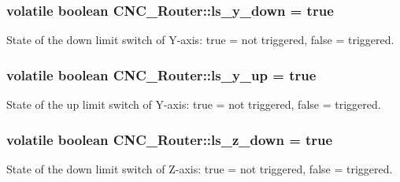 \hypertarget{class_c_n_c___router_a1932890e5458f9113355f1bdb854e1ce}{
\subsubsection[{ls\+\_\+y\+\_\+down}]{\setlength{\rightskip}{0pt plus 5cm}volatile boolean C\+N\+C\+\_\+\+Router\+::ls\+\_\+y\+\_\+down = true\hspace{0.3cm}{\ttfamily [static]}}}\label{class_c_n_c___router_a1932890e5458f9113355f1bdb854e1ce}


State of the down limit switch of Y-\/axis\+: true = not triggered, false = triggered. 

\hypertarget{class_c_n_c___router_a74a44cdb470bb6256551bffc3538b938}{
\subsubsection[{ls\+\_\+y\+\_\+up}]{\setlength{\rightskip}{0pt plus 5cm}volatile boolean C\+N\+C\+\_\+\+Router\+::ls\+\_\+y\+\_\+up = true\hspace{0.3cm}{\ttfamily [static]}}}\label{class_c_n_c___router_a74a44cdb470bb6256551bffc3538b938}


State of the up limit switch of Y-\/axis\+: true = not triggered, false = triggered. 

\hypertarget{class_c_n_c___router_a30b5c6e169b20b9d8b11be6d638b2958}{
\subsubsection[{ls\+\_\+z\+\_\+down}]{\setlength{\rightskip}{0pt plus 5cm}volatile boolean C\+N\+C\+\_\+\+Router\+::ls\+\_\+z\+\_\+down = true\hspace{0.3cm}{\ttfamily [static]}}}\label{class_c_n_c___router_a30b5c6e169b20b9d8b11be6d638b2958}


State of the down limit switch of Z-\/axis\+: true = not triggered, false = triggered. 

